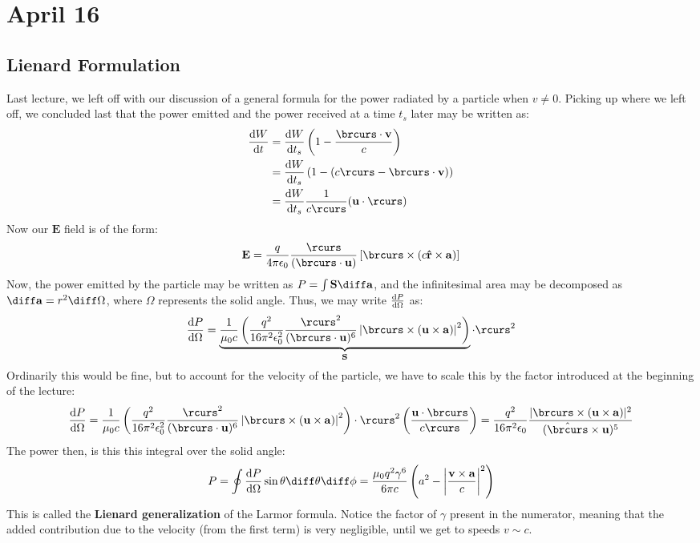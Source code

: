 \section{April 16}
\subsection{Lienard Formulation}
Last lecture, we left off with our discussion of a general formula for the power radiated by a particle when
\( v \neq 0 \). Picking up where we left off, we concluded last that the power emitted and the power received
at a time \( t_s \) later may be written as:
\begin{align*}
	\dv{W}{t} &= \dv{W}{t_s} \left( 1 - \frac{\brcurs \cdot \mathbf{v}}{c} \right)\\
			  &= \dv{W}{t_s}\left( 1 - \left( c \rcurs - \brcurs \cdot \mathbf{v} \right) \right) \\ 
			  &= \dv{W}{t_s} \frac{1}{c\rcurs} (\mathbf{u} \cdot \rcurs) 
\end{align*}
Now our \( \mathbf{E} \) field is of the form:
\[
	\mathbf{E} = \frac{q}{4\pi \epsilon_0} \frac{\rcurs}{(\brcurs \cdot \mathbf{u})}\left[ \brcurs \times (c
	\mathbf{\hat{r}} \times \mathbf{a})\right]
\]
Now, the power emitted by the particle may be written as \( P = \int \mathbf{S} \diff \mathbf{a} \), and the
infinitesimal area may be decomposed as \( \diff \mathbf{a} = r^2 \diff \Omega \), where \( \Omega \)
represents the solid angle. Thus, we may write \( \dv{P}{\Omega} \) as:
\[
	\dv{P}{\Omega} = \underbrace{\frac{1}{\mu_0c} \left( \frac{q^2}{16 \pi^2 \epsilon_0^2}
			\frac{\rcurs^2}{(\brcurs \cdot \mathbf{u})^{6}}\left|\brcurs \times (\mathbf{u} \times \mathbf{a})\right|^2 
	\right)}_{\mathbf{S}} \cdot \rcurs^2
\]
Ordinarily this would be fine, but to account for the velocity of the particle, we have to scale this by the
factor introduced at the beginning of the lecture:
\[
	\dv{P}{\Omega} = \frac{1}{\mu_0c} \left( \frac{q^2}{16 \pi^2 \epsilon_0^2} \frac{\rcurs^2}{(\brcurs \cdot
	\mathbf{u})^{6}}\left|\brcurs \times (\mathbf{u} \times \mathbf{a})\right|^2 \right) \cdot \rcurs^2
	\left( \frac{\mathbf{u} \cdot \brcurs}{c\rcurs} \right) = \frac{q^2}{16 \pi^2 \epsilon_0} \frac{|\brcurs
	\times (\mathbf{u} \times \mathbf{a})|^2}{(\hat{\brcurs} \times \mathbf{u})^{5}}
\]
The power then, is this this integral over the solid angle:
\begin{equation}
	\label{lienard}
	P = \oint \dv{P}{\Omega} \sin \theta \diff \theta \diff \phi = \frac{\mu_0 q^2 \gamma^{6}}{6 \pi c}\left(
	a^2 - \left| \frac{\mathbf{v} \times \mathbf{a}}{c} \right|^2 \right)
\end{equation}
This is called the \textbf{Lienard generalization} of the Larmor formula. Notice the factor of \( \gamma \)
present in the numerator, meaning that the added contribution due to the velocity (from the first term) is
very negligible, until we get to speeds \( v \sim c \).   


